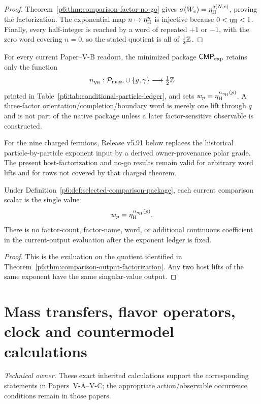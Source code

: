 \documentclass[11pt,a4paper]{article}
\newcommand{\CMPexp}{\mathsf{CMP}_{\rm exp}}
\newcommand{\etaH}{\eta_{\rm H}}
\begin{document}
\begin{proof}
Theorem~\ref{p6:thm:comparison-factor-no-go} gives
\(\sigma(W_e)=\etaH^{q(N,e)}\), proving the factorization.  The exponential
map \(n\mapsto\etaH^n\) is injective because \(0<\etaH<1\).  Finally, every
half-integer is reached by a word of repeated \(+1\) or \(-1\), with the zero
word covering \(n=0\), so the stated quotient is all of \(\tfrac12\mathbb{Z}\).
\end{proof}

\begin{definition}
\label{p6:def:selected-comparison-package}
For every current Paper--V-B readout, the minimized package \(\CMPexp\) retains
only the function
\[
n_{\etaH}:\mathcal P_{\rm mass}\cup\{g,\gamma\}
\longrightarrow\tfrac12\ZZ
\]
printed in Table~\ref{p6:tab:conditional-particle-ledger}, and sets
\(w_p=\etaH^{n_{\etaH}(p)}\).  A three-factor
orientation/completion/boundary word is merely one lift through \(q\) and is
not part of the native package unless a later factor-sensitive observable is
constructed.
\end{definition}


\begin{remark}
\label{p6:rem:v591-charged-package-supersession-forward}
For the nine charged fermions, Release v5.91 below replaces the historical
particle-by-particle exponent input by a derived owner-provenance polar grade.
The present host-factorization and no-go results remain valid for arbitrary
word lifts and for rows not covered by that charged theorem.
\end{remark}

\begin{theorem}
\label{p6:thm:conditional-comparison-grading}
Under Definition~\ref{p6:def:selected-comparison-package}, each current
comparison scalar is the single value
\[
w_p=\etaH^{n_{\etaH}(p)}.
\]
There is no factor-count, factor-name, word, or additional continuous
coefficient in the current-output evaluation after the exponent ledger is
fixed.
\end{theorem}

\begin{proof}
This is the evaluation on the quotient identified in
Theorem~\ref{p6:thm:comparison-output-factorization}.  Any two host lifts of
the same exponent have the same singular-value output.
\end{proof}


\section{Mass transfers, flavor operators, clock and countermodel calculations}
\label{p5d:sec:D}
\noindent\textit{Technical owner.} These exact inherited calculations
support the corresponding statements in Papers~V-A--V-C;
the appropriate action/observable occurrence conditions remain in those papers.
\end{document}
